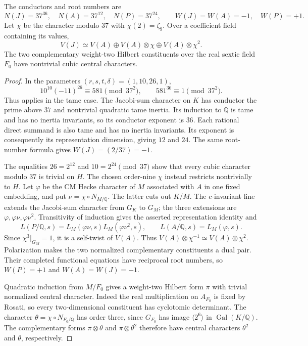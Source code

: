 \begin{proposition}
\label{prop:thirtyseven-character}
The conductors and root numbers are
\[
 N(J)=37^{36},\quad N(A)=37^{12},\quad N(P)=37^{24},
 \qquad W(J)=W(A)=-1,\quad W(P)=+1.
\]
Let $\chi$ be the character modulo $37$ with $\chi(2)=\zeta_9$.
Over a coefficient field containing its values,
\[
 V(J)\simeq V(A)\oplus V(A)\otimes\chi
                   \oplus V(A)\otimes\chi^2.
\]
The two complementary weight-two Hilbert constituents over the real
sextic field $F_0$ have nontrivial cubic central characters.
\end{proposition}
\begin{proof}
In the parameters $(r,s,t,\delta)=(1,10,26,1)$,
\[
 10^{10}(-11)^{26}\equiv581\pmod{37^2},\qquad
 581^{36}\equiv1\pmod{37^2}.
\]
Thus \citet[Proposition~3.12, p.~16; Theorem~3.13,
pp.~17--18]{ShuExpanded2021} applies in the tame case.
The Jacobi-sum character on $K$ has conductor the prime above $37$
and nontrivial quadratic tame inertia.  Its induction to $\mathbb Q$
is tame and has no inertia invariants, so its conductor exponent is
$36$.  Each rational direct summand is also tame and has no inertia
invariants.  Its exponent is consequently its representation
dimension, giving $12$ and $24$.  The same root-number formula gives
$W(J)=(2/37)=-1$.

The equalities $26=2^{12}$ and $10=2^{24}\pmod{37}$ show that every
cubic character modulo $37$ is trivial on $H$.  The chosen
order-nine $\chi$ instead restricts nontrivially to $H$.
Let $\varphi$ be the CM Hecke character of $M$ associated with $A$
in one fixed embedding, and put $\nu=\chi\circ N_{M/\mathbb Q}$.
The latter cuts out $K/M$.  The $c$-invariant line extends the
Jacobi-sum character from $G_K$ to $G_M$; the three extensions are
$\varphi,\varphi\nu,\varphi\nu^2$.  Transitivity of induction gives
the asserted representation identity and
\[
 L(P/\mathbb Q,s)=L_M(\varphi\nu,s)L_M(\varphi\nu^2,s),
 \qquad L(A/\mathbb Q,s)=L_M(\varphi,s).
\]
Since $\chi^3|_{G_M}=1$, it is a self-twist of $V(A)$.
Thus $V(A)\otimes\chi^{-1}\simeq V(A)\otimes\chi^2$.
Polarization makes the two normalized complementary constituents a
dual pair.  Their completed functional equations have reciprocal
root numbers, so $W(P)=+1$ and $W(A)=W(J)=-1$.

Quadratic induction from $M/F_0$ gives a weight-two Hilbert form
$\pi$ with trivial normalized central character.  Indeed the real
multiplication on $A_{F_0}$ is fixed by Rosati, so every
two-dimensional constituent has cyclotomic determinant.
The character $\theta=\chi\circ N_{F_0/\mathbb Q}$ has order three,
since $G_{F_0}$ has image $\langle2^6\rangle$ in
$\operatorname{Gal}(K/\mathbb Q)$.  The complementary forms
$\pi\otimes\theta$ and $\pi\otimes\theta^2$ therefore have central
characters $\theta^2$ and $\theta$, respectively.
\end{proof}

